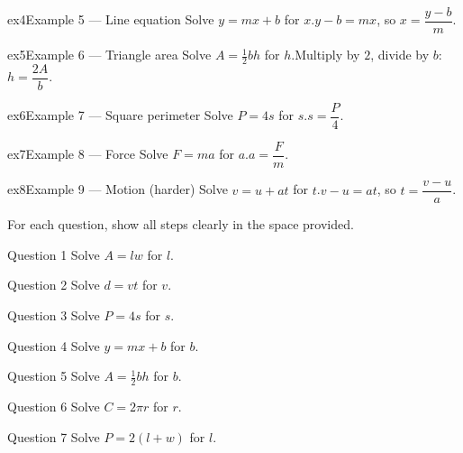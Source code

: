 \documentclass[11pt]{article}
\begin{document}
\begin{example}{ex4}{Example 5 --- Line equation}
Solve $y=mx+b$ for $x$.\soln $y-b=mx$, so $x=\dfrac{y-b}{m}$.
\end{example}

\begin{example}{ex5}{Example 6 --- Triangle area}
Solve $A=\tfrac12 bh$ for $h$.\soln Multiply by $2$, divide by $b$: $h=\dfrac{2A}{b}$.
\end{example}

\begin{example}{ex6}{Example 7 --- Square perimeter}
Solve $P=4s$ for $s$.\soln $s=\dfrac{P}{4}$.
\end{example}

\begin{example}{ex7}{Example 8 --- Force}
Solve $F=ma$ for $a$.\soln $a=\dfrac{F}{m}$.
\end{example}

\begin{example}{ex8}{Example 9 --- Motion (harder)}
Solve $v=u+at$ for $t$.\soln $v-u=at$, so $t=\dfrac{v-u}{a}$.
\end{example}

\clearpage
{}
For each question, show all steps clearly in the space provided.

\begin{qbox}{Question 1}
Solve $A=lw$ for $l$.\workspace{2.0cm}
\end{qbox}

\begin{qbox}{Question 2}
Solve $d=vt$ for $v$.\workspace{2.0cm}
\end{qbox}

\begin{qbox}{Question 3}
Solve $P=4s$ for $s$.\workspace{1.8cm}
\end{qbox}

\begin{qbox}{Question 4}
Solve $y=mx+b$ for $b$.\workspace{2.0cm}
\end{qbox}

\begin{qbox}{Question 5}
Solve $A=\tfrac12 bh$ for $b$.\workspace{2.2cm}
\end{qbox}

\begin{qbox}{Question 6}
Solve $C=2\pi r$ for $r$.\workspace{2.0cm}
\end{qbox}

\begin{qbox}{Question 7}
Solve $P=2(l+w)$ for $l$.\workspace{2.4cm}
\end{qbox}
\end{document}
